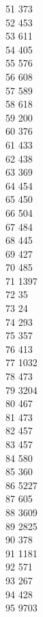{ 51	373 \\
 52	453 \\
 53	611 \\
 54	405 \\
 55	576 \\
 56	608 \\
 57	589 \\
 58	618 \\
 59	200 \\
 60	376 \\
 61	433 \\
 62	438 \\
 63	369 \\
 64	454 \\
 65	450 \\
 66	504 \\
 67	484 \\
 68	445 \\
 69	427 \\
 70	485 \\
 71	1397 \\
 72	35 \\
 73	24 \\
 74	293 \\
 75	357 \\
 76	413 \\
 77	1032 \\
 78	473 \\
 79	3204 \\
 80	467 \\
 81	473 \\
 82	457 \\
 83	457 \\
 84	580 \\
 85	360 \\
 86	5227 \\
 87	605 \\
 88	3609 \\
 89	2825 \\
 90	378 \\
 91	1181 \\
 92	571 \\
 93	267 \\
 94	428 \\
 95	9703 \\
}
